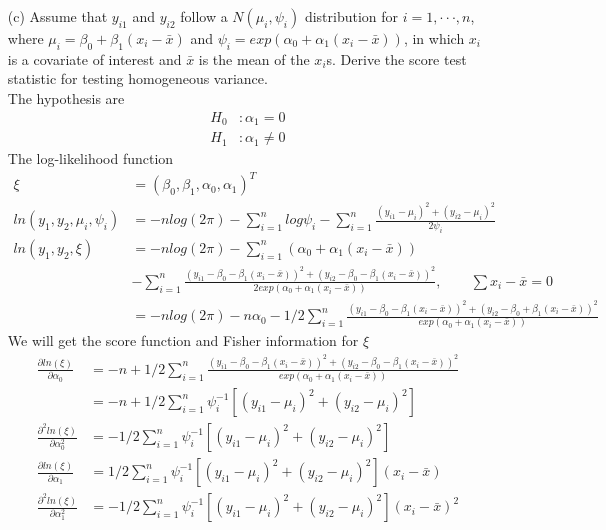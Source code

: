 \documentclass[11pt]{article} %
\begin{document}
\begin{itemize}
	\item[(c)]  Assume that $y_{i1}$ and $y_{i2}$ follow a $N(\mu_i, \psi_i)$ distribution for $i = 1, · · · , n$,
	where $\mu_i = \beta_0 + \beta_1(x_i - \bar{x})$ and $\psi_i = exp(\alpha_0 + \alpha_1(x_i - \bar{x}))$, in which $x_i$ is
	a covariate of interest and $\bar{x}$ is the mean of the $x_i$s. Derive the score test statistic for testing homogeneous variance.\\
	The hypothesis are
	\begin{align*}
		H_0 &: \alpha_1 = 0 \\
		H_1 &: \alpha_1 \neq 0 
	\end{align*}  
	The log-likelihood function
	\begin{align*}
		\xi &= (\beta_0, \beta_1, \alpha_0, \alpha_1)^T\\
		ln(y_{1}, y_{2}, \mu_i, \psi_i) &= -n log(2\pi) - \sum_{i=1}^n log\psi_i -\sum_{i=1}^n  \frac{(y_{i1}-\mu_i)^2 + (y_{i2}-\mu_i)^2}{2 \psi_i} \\
		ln(y_{1}, y_{2}, \xi) &= -n log(2\pi) - \sum_{i=1}^n (\alpha_0 + \alpha_1(x_i - \bar{x})) \\
		& -\sum_{i=1}^n  \frac{(y_{i1}-\beta_0 - \beta_1(x_i - \bar{x}))^2 + (y_{i2}-\beta_0 - \beta_1(x_i - \bar{x}))^2}{2 exp(\alpha_0 + \alpha_1(x_i - \bar{x}))}, \qquad \sum x_i -\bar{x} = 0\\
		&= -n log(2\pi) - n\alpha_0 -1/2 \sum_{i=1}^n  \frac{(y_{i1}-\beta_0 - \beta_1(x_i - \bar{x}))^2 + (y_{i2}-\beta_0 + \beta_1(x_i - \bar{x}))^2}{exp(\alpha_0 + \alpha_1(x_i - \bar{x}))}
	\end{align*}
	We will get the score function and Fisher information for $\xi$
	\begin{align*}
		\frac{ \partial ln(\xi)}{\partial \alpha_0} &= - n + 1/2 \sum_{i=1}^n  \frac{(y_{i1}-\beta_0 - \beta_1(x_i - \bar{x}))^2 + (y_{i2}-\beta_0 - \beta_1(x_i - \bar{x}))^2}{exp(\alpha_0 + \alpha_1(x_i - \bar{x}))}\\
		&= - n + 1/2  \sum_{i=1}^n \psi_i^{-1} [(y_{i1}-\mu_i)^2 + (y_{i2}-\mu_i)^2]\\
		\frac{ \partial^2 ln(\xi)}{\partial \alpha_0^2} &= -1/2  \sum_{i=1}^n \psi_i^{-1} [(y_{i1}-\mu_i)^2 + (y_{i2}-\mu_i)^2]
	\end{align*}
	\begin{align*}
		\frac{ \partial ln(\xi)}{\partial \alpha_1} &=  1/2  \sum_{i=1}^n \psi_i^{-1} [(y_{i1}-\mu_i)^2 + (y_{i2}-\mu_i)^2] (x_i-\bar{x})\\
		\frac{ \partial^2 ln(\xi)}{\partial \alpha_1^2} &= -1/2  \sum_{i=1}^n \psi_i^{-1} [(y_{i1}-\mu_i)^2 + (y_{i2}-\mu_i)^2](x_i-\bar{x})^2

\end{align*}
\end{itemize}
\end{document}
